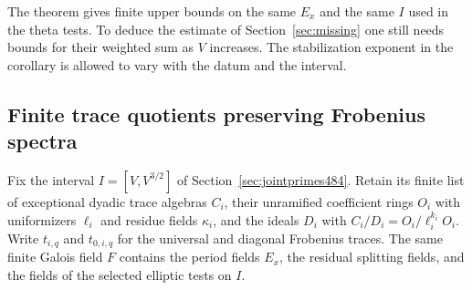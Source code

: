\documentclass[a4paper,11pt]{article}
\theoremstyle{definition}
\theoremstyle{remark}
\numberwithin{equation}{section}
\begin{document}
The theorem gives finite upper bounds on the same \(E_x\) and
the same \(I\) used in the theta tests. To deduce the estimate of
Section~\ref{sec:missing} one still needs bounds for their weighted
sum as \(V\) increases. The stabilization exponent in the corollary
is allowed to vary with the datum and the interval.


\subsection{Finite trace quotients preserving Frobenius spectra}
\label{sec:spectralquot499}

Fix the interval \(I=[V,V^{3/2}]\) of
Section~\ref{sec:jointprimes484}. Retain its finite list of
exceptional dyadic trace algebras \(C_i\), their unramified
coefficient rings \(O_i\) with uniformizers \(\ell_i\) and
residue fields \(\kappa_i\), and the ideals \(D_i\) with
\(C_i/D_i=O_i/\ell_i^{k_i}O_i\). Write \(t_{i,q}\) and
\(t_{0,i,q}\) for the universal and diagonal Frobenius traces.
The same finite Galois field \(F\) contains the period fields
\(E_x\), the residual splitting fields, and the fields of the
selected elliptic tests on \(I\).
\end{document}

